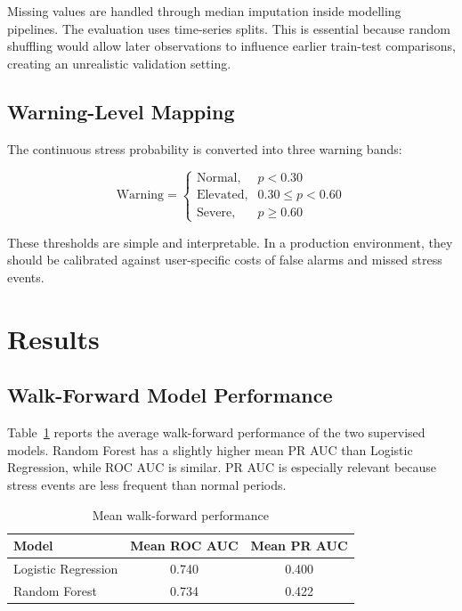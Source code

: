 \documentclass[12pt,a4paper]{article}
\begin{document}
Missing values are handled through median imputation inside modelling pipelines. The evaluation uses time-series splits. This is essential because random shuffling would allow later observations to influence earlier train-test comparisons, creating an unrealistic validation setting.

\subsection{Warning-Level Mapping}

The continuous stress probability is converted into three warning bands:

\begin{equation}
\text{Warning} =
\begin{cases}
\text{Normal}, & p < 0.30 \\
\text{Elevated}, & 0.30 \leq p < 0.60 \\
\text{Severe}, & p \geq 0.60
\end{cases}
\end{equation}

These thresholds are simple and interpretable. In a production environment, they should be calibrated against user-specific costs of false alarms and missed stress events.

\section{Results}

\subsection{Walk-Forward Model Performance}

Table~\ref{tab:model_results} reports the average walk-forward performance of the two supervised models. Random Forest has a slightly higher mean PR AUC than Logistic Regression, while ROC AUC is similar. PR AUC is especially relevant because stress events are less frequent than normal periods.

\begin{table}[H]
\centering
\caption{Mean walk-forward performance}
\label{tab:model_results}
\begin{tabular}{lcc}
\toprule
\textbf{Model} & \textbf{Mean ROC AUC} & \textbf{Mean PR AUC} \\
\midrule
Logistic Regression & 0.740 & 0.400 \\
Random Forest & 0.734 & 0.422 \\
\bottomrule
\end{tabular}
\end{table}
\end{document}
